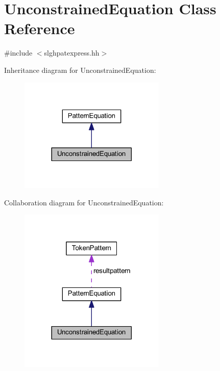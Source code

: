 \hypertarget{class_unconstrained_equation}{}\section{Unconstrained\+Equation Class Reference}
\label{class_unconstrained_equation}


{\ttfamily \#include $<$slghpatexpress.\+hh$>$}



Inheritance diagram for Unconstrained\+Equation\+:
\nopagebreak
\begin{figure}[H]
\begin{center}
\leavevmode
\includegraphics[width=197pt]{class_unconstrained_equation__inherit__graph}
\end{center}
\end{figure}


Collaboration diagram for Unconstrained\+Equation\+:
\nopagebreak
\begin{figure}[H]
\begin{center}
\leavevmode
\includegraphics[width=197pt]{class_unconstrained_equation__coll__graph}
\end{center}
\end{figure}
